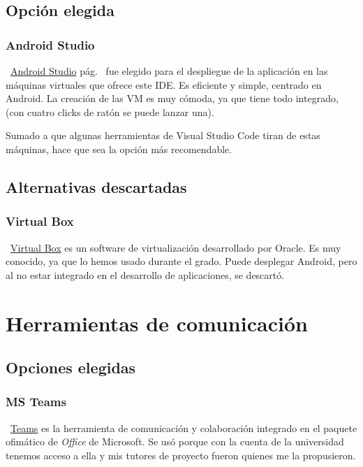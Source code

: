 \subsection{Opción elegida}

\subsubsection{Android Studio}
~\href{https://developer.android.com/studio}{Android Studio} pág.~\pageref{androidstudio} fue elegido para el despliegue de la aplicación en las máquinas virtuales que ofrece este IDE. Es eficiente y simple, centrado en Android. La creación de las VM es muy cómoda, ya que tiene todo integrado, (con cuatro clicks de ratón se puede lanzar una).

Sumado a que algunas herramientas de Visual Studio Code tiran de estas máquinas, hace que sea la opción más recomendable.

\subsection{Alternativas descartadas}

\subsubsection{Virtual Box}
~\href{https://www.virtualbox.org/}{Virtual Box} es un software de virtualización desarrollado por Oracle. Es muy conocido, ya que lo hemos usado durante el grado. Puede desplegar Android, pero al no estar integrado en el desarrollo de aplicaciones, se descartó.


\section{Herramientas de comunicación}

\subsection{Opciones elegidas}

\subsubsection{MS Teams}
~\href{https://www.microsoft.com/es-ww/microsoft-365/microsoft-teams/download-app}{Teams} es la herramienta de comunicación y colaboración integrado en el paquete ofimático de \emph{Office} de Microsoft. Se usó porque con la cuenta de la universidad tenemos acceso a ella y mis tutores de proyecto fueron quienes me la propusieron.

